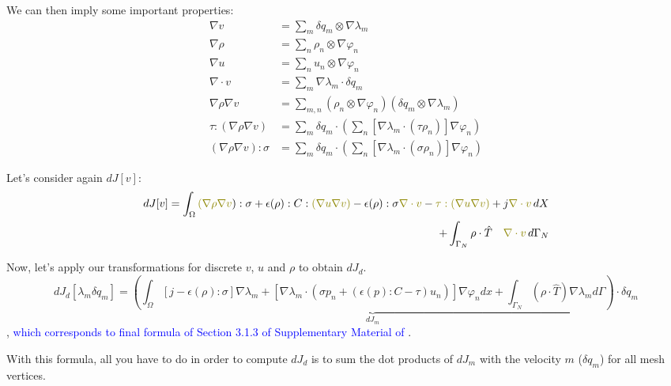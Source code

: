 \documentclass[11pt]{article}
\newcommand{\blue}{\textcolor{blue}}
\newcommand{\olive}{\textcolor{olive}}
\begin{document}
We can then imply some important properties:
\begin{align*}
    \nabla v &= \sum_m   \delta q_m \otimes \nabla \lambda_m\\
    \nabla \rho &= \sum_n   \rho_n \otimes \nabla \varphi_n\\
    \nabla u &= \sum_n   u_n \otimes \nabla \varphi_n\\
    \nabla \cdot v &= \sum_m   \nabla \lambda_m \cdot \delta q_m\\    
    \nabla \rho \nabla v &= \sum_{m,n} (\rho_n \otimes \nabla \varphi_n)(\delta q_m \otimes \nabla \lambda_m)\\
    \tau:(\nabla \rho \nabla v) &= \sum_m \delta q_m \cdot (\sum_n \left[ \nabla \lambda_m \cdot (\tau \rho_n) \right] \nabla \varphi_n)\\
    (\nabla \rho \nabla v):\sigma &= \sum_m \delta q_m \cdot (\sum_n \left[ \nabla \lambda_m \cdot (\sigma \rho_n) \right] \nabla \varphi_n)
\end{align*}

Let's consider again $dJ[v]$:
\begin{align*}
  dJ[v] = \int_{\Omega} \olive{(\nabla \rho \nabla v}):\sigma + \epsilon(\rho):C:\olive{(\nabla u \nabla v)} - \epsilon(\rho): \sigma \olive{\nabla \cdot v}  - \olive{\tau : (\nabla u \nabla v)} + j \olive{\nabla \cdot v} \, dX \\ + \int_{\Gamma_{N}} \rho \cdot \hat T \quad \olive{\nabla \cdot v}\, d\Gamma_{N}
\end{align*}

Now, let's apply our transformations for discrete $v$, $u$ and $\rho$ to obtain $dJ_d$.
\begin{equation}
  \boxed{dJ_d[\lambda_m \delta q_m] = \underbrace{\left( \int_\Omega \left[ j - \epsilon(\rho):\sigma \right] \nabla \lambda_m + \left[ \nabla \lambda_m \cdot (\sigma p_n + (\epsilon(p):C-\tau)u_n) \right] \nabla \varphi_n dx + \int_{\Gamma_N} (\rho \cdot \hat T) \nabla \lambda_m d\Gamma \right)}_{dJ_m} \cdot \delta q_m}
\end{equation}
, \blue{which corresponds to final formula of Section 3.1.3 of Supplementary Material of \cite{panetta2017}}.

With this formula, all you have to do in order to compute $dJ_d$ is to sum the dot products of $dJ_m$ with the velocity $m$ ($\delta q_m$) for all mesh vertices.



 
\end{document}
